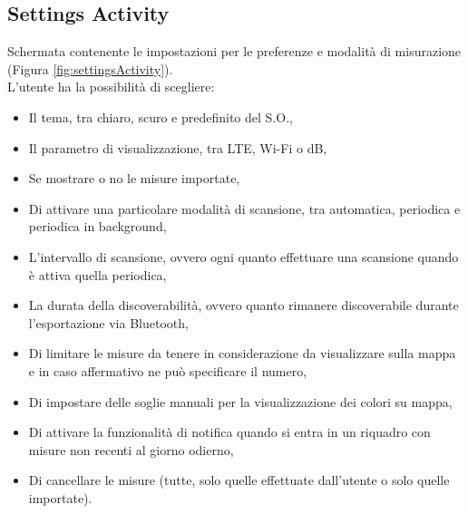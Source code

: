 \documentclass[11pt]{article}
\begin{document}
\subsection{Settings Activity}
\label{sec:settingsActivity}
Schermata contenente le impostazioni per le preferenze e modalità di misurazione (Figura \ref{fig:settingsActivity}). \\
L'utente ha la possibilità di scegliere:
\begin{itemize}
    \item Il tema, tra chiaro, scuro e predefinito del S.O.,
    \item Il parametro di visualizzazione, tra LTE, Wi-Fi o dB,
    \item Se mostrare o no le misure importate,
    \item Di attivare una particolare modalità di scansione, tra automatica, periodica e periodica in background,
    \item L'intervallo di scansione, ovvero ogni quanto effettuare una scansione quando è attiva quella periodica,
    \item La durata della discoverabilità, ovvero quanto rimanere discoverabile durante l'esportazione via Bluetooth,
    \item Di limitare le misure da tenere in considerazione da visualizzare sulla mappa e in caso affermativo ne può specificare il numero,
    \item Di impostare delle soglie manuali per la visualizzazione dei colori su mappa,
    \item Di attivare la funzionalità di notifica quando si entra in un riquadro con misure non recenti al giorno odierno,
    \item Di cancellare le misure (tutte, solo quelle effettuate dall'utente o solo quelle importate).
\end{itemize}
\end{document}
